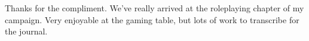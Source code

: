 Thanks for the compliment. We've really arrived at the roleplaying chapter of my campaign. Very enjoyable at the gaming table, but lots of work to transcribe for the journal.\\

